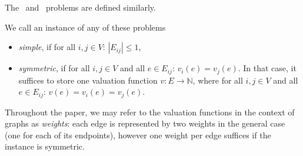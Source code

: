 The \EFXo\ and \EFXmc\ problems are defined similarly.

We call an instance of any of these problems
\begin{itemize}
    \item \emph{simple}, if for all $i,j \in V$: $|E_{ij}|\leq 1$,
    \item \emph{symmetric}, if for all $i,j \in V$ and all $e\in E_{ij}$: $v_i(e)=v_j(e)$. In that case, it suffices to store one valuation function $v \colon E \to \mathbb{N}$, where for all $i,j \in V$ and all $e\in E_{ij}$: $v(e)=v_i(e)=v_j(e)$.
\end{itemize}

Throughout the paper, we may refer to the valuation functions in the context of graphs as \emph{weights}: each edge is represented by two weights in the general case (one for each of its endpoints), however one weight per edge suffices if the instance is symmetric.


\begin{toappendix}
    
\end{toappendix}
